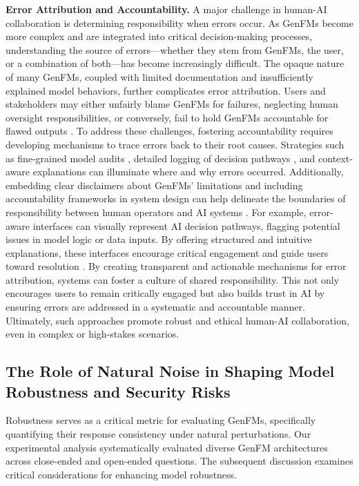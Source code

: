 \textbf{Error Attribution and Accountability.}
A major challenge in human-AI collaboration is determining responsibility when errors occur. As GenFMs become more complex and are integrated into critical decision-making processes, understanding the source of errors—whether they stem from GenFMs, the user, or a combination of both—has become increasingly difficult. The opaque nature of many GenFMs, coupled with limited documentation and insufficiently explained model behaviors, further complicates error attribution. Users and stakeholders may either unfairly blame GenFMs for failures, neglecting human oversight responsibilities, or conversely, fail to hold GenFMs accountable for flawed outputs \cite{walkermunro2022guiltysiliconmindblameworthiness, ryan2023whatsrolemodellingresponsibility, qi2024causalresponsibilityattributionhumanai, miller2023accountableai}. To address these challenges, fostering accountability requires developing mechanisms to trace errors back to their root causes. Strategies such as fine-grained model audits \cite{Mokander2023}, detailed logging of decision pathways \cite{10445154}, and context-aware explanations \cite{rauba2024contextaware} can illuminate where and why errors occurred. Additionally, embedding clear disclaimers about GenFMs' limitations and including accountability frameworks in system design can help delineate the boundaries of responsibility between human operators and AI systems \cite{ryan2023whatsrolemodellingresponsibility, gao2021accountability, brahman2024the}. For example, error-aware interfaces can visually represent AI decision pathways, flagging potential issues in model logic or data inputs. By offering structured and intuitive explanations, these interfaces encourage critical engagement and guide users toward resolution \cite{Cabrera_2021, glassman2024airesilientinterfaces}. By creating transparent and actionable mechanisms for error attribution, systems can foster a culture of shared responsibility. This not only encourages users to remain critically engaged but also builds trust in AI by ensuring errors are addressed in a systematic and accountable manner. Ultimately, such approaches promote robust and ethical human-AI collaboration, even in complex or high-stakes scenarios.

\subsection{The Role of Natural Noise in Shaping Model Robustness and Security Risks}
Robustness serves as a critical metric for evaluating GenFMs, specifically quantifying their response consistency under natural perturbations. Our experimental analysis systematically evaluated diverse GenFM architectures across close-ended and open-ended questions. The subsequent discussion examines critical considerations for enhancing model robustness.


